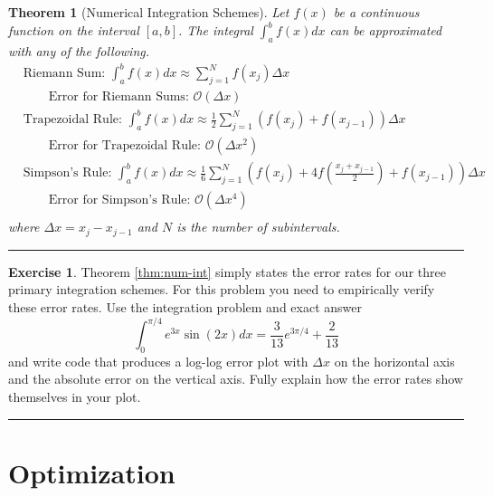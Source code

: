 \documentclass[
]{book}
\newtheorem{theorem}{Theorem}[chapter]
\theoremstyle{definition}
\theoremstyle{definition}
\theoremstyle{definition}
\newtheorem{exercise}{Exercise}[chapter]
\theoremstyle{remark}
\begin{document}
\begin{theorem}[Numerical Integration Schemes]
\protect\hypertarget{thm:num-int}{}{\label{thm:num-int} {} }Let \(f(x)\) be a continuous function on the interval \([a,b]\). The integral \(\int_a^b f(x) dx\) can be approximated with any of the following.
\[\begin{aligned}
       &\text{Riemann Sum: }  \int_a^b f(x) dx \approx \sum_{j=1}^N f(x_j) \Delta x \\
       & \qquad \text{Error for Riemann Sums: } \mathcal{O}(\Delta x) \\
       &\text{Trapezoidal Rule: }  \int_a^b f(x) dx \approx \frac{1}{2} \sum_{j=1}^N
       \left( f(x_j) + f(x_{j-1}) \right) \Delta x \\
       & \qquad \text{Error for Trapezoidal Rule: } \mathcal{O}(\Delta x^2) \\
       &\text{Simpson's Rule: }  \int_a^b f(x) dx \approx \frac{1}{6} \sum_{j=1}^N \left(
       f(x_j) + 4 f\left( \frac{x_j + x_{j-1}}{2} \right) + f(x_{j-1}) \right) \Delta x \\
       & \qquad \text{Error for Simpson's Rule: } \mathcal{O}(\Delta x^4) \\
    \end{aligned}\] where \(\Delta x = x_j - x_{j-1}\) and \(N\) is the
number of subintervals.
\end{theorem}

\begin{center}\rule{0.5\linewidth}{0.5pt}\end{center}

\begin{exercise}
\protect\hypertarget{exr:unnamed-chunk-188}{}{\label{exr:unnamed-chunk-188} }Theorem \ref{thm:num-int} simply states the error rates for our three
primary integration schemes. For this problem you need to empirically
verify these error rates. Use the integration problem and exact answer
\[\int_0^{\pi/4} e^{3x} \sin(2x) dx = \frac{3}{13} e^{3\pi/4} + \frac{2}{13}\]
and write code that produces a log-log error plot with \(\Delta x\) on the
horizontal axis and the absolute error on the vertical axis. Fully
explain how the error rates show themselves in your plot.
\end{exercise}

\begin{center}\rule{0.5\linewidth}{0.5pt}\end{center}

\hypertarget{optimization}{%
\section{Optimization}\label{optimization}}
\end{document}
